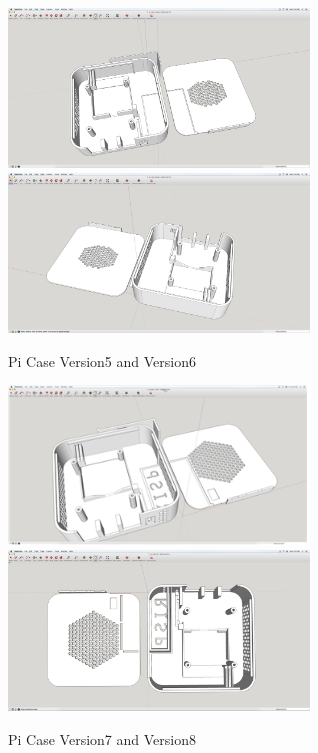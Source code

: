 \documentclass[11pt
  , a4paper
  , article
  , oneside
]{memoir}
\begin{document}
\begin{center}
	\begin{figure}[h]
		\includegraphics[width=8cm]{./images/V5.png}
		\includegraphics[width=8cm]{./images/V6.png}
		\caption{Pi Case Version5 and Version6}
	\end{figure}
\end{center}
\begin{center}
	\begin{figure}[h]
		\includegraphics[width=8cm]{./images/V7.png}
		\includegraphics[width=8cm]{./images/V8.png}
		\caption{Pi Case Version7 and Version8}
	\end{figure}
\end{center}
\end{document}
